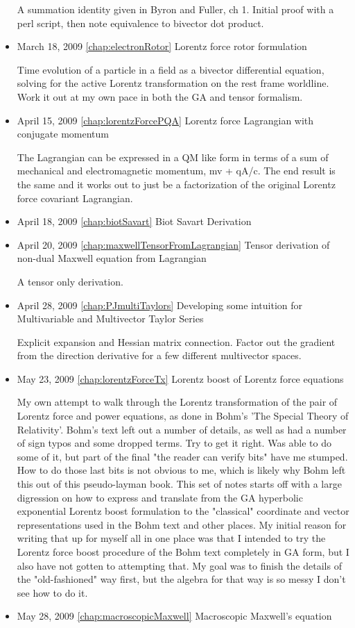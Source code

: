 \begin{itemize}
A summation identity given in Byron and Fuller, ch 1.  Initial proof with a perl script, then note equivalence to bivector dot product. \item March 18, 2009 \ref{chap:electronRotor} Lorentz force rotor formulation

Time evolution of a particle in a field as a bivector differential equation, solving for the active Lorentz transformation on the rest frame worldline.  Work it out at my own pace in both the GA and tensor formalism.   \item April 15, 2009 \ref{chap:lorentzForcePQA} Lorentz force Lagrangian with conjugate momentum

The Lagrangian can be expressed in a QM like form in terms of a sum of mechanical and electromagnetic momentum, mv + qA/c.  The end result is the same and it works out to just be a factorization of the original Lorentz force covariant Lagrangian. \item April 18, 2009 \ref{chap:biotSavart} Biot Savart Derivation

\item April 20, 2009 \ref{chap:maxwellTensorFromLagrangian} Tensor derivation of non-dual Maxwell equation from Lagrangian

A tensor only derivation. \item April 28, 2009 \ref{chap:PJmultiTaylors} Developing some intuition for Multivariable and Multivector Taylor Series

Explicit expansion and Hessian matrix connection.  Factor out the gradient from the direction derivative for a few different multivector spaces. \item May 23, 2009 \ref{chap:lorentzForceTx} Lorentz boost of Lorentz force equations

My own attempt to walk through the Lorentz transformation of the pair of Lorentz force and power equations, as done in Bohm's 'The Special Theory of Relativity'.  Bohm's text left out a number of details, as well as had a number of sign typos and some dropped terms.  Try to get it right.  Was able to do some of it, but part of the final "the reader can verify bits" have me stumped.  How to do those last bits is not obvious to me, which is likely why Bohm left this out of this pseudo-layman book.  This set of notes starts off with a large digression on how to express and translate from the GA hyperbolic exponential Lorentz boost formulation to the "classical" coordinate and vector representations used in the Bohm text and other places.  My initial reason for writing that up for myself all in one place was that I intended to try the Lorentz force boost procedure of the Bohm text completely in GA form, but I also have not gotten to attempting that.  My goal was to finish the details of the "old-fashioned" way first, but the algebra for that way is so messy I don't see how to do it. \item May 28, 2009 \ref{chap:macroscopicMaxwell} Macroscopic Maxwell's equation


\end{itemize}
